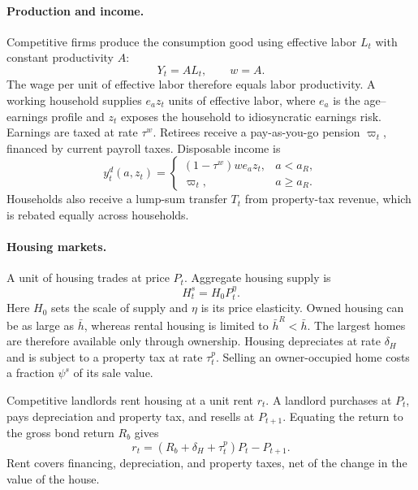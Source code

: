 \paragraph{Production and income.}
Competitive firms produce the consumption good using effective labor $L_t$
with constant productivity $A$:
\begin{equation}
 Y_t=A L_t,\qquad w=A.
 \label{eq:env-production}
\end{equation}
The wage per unit of effective labor therefore equals labor productivity.
A working household supplies $e_a z_t$ units of effective labor, where $e_a$
is the age--earnings profile and $z_t$ exposes the household to idiosyncratic
earnings risk. Earnings are taxed at rate $\tau^w$. Retirees receive a
pay-as-you-go pension $\varpi_t$, financed by current payroll taxes.
Disposable income is
\begin{equation}
 y_t^d(a,z_t)=
 \begin{cases}
 (1-\tau^w)w e_a z_t, & a<a_R,\\
 \varpi_t, & a\geq a_R.
 \end{cases}
 \label{eq:env-income}
\end{equation}
Households also receive a lump-sum transfer $T_t$ from property-tax revenue,
which is rebated equally across households.

\paragraph{Housing markets.}
A unit of housing trades at price $P_t$. Aggregate housing supply is
\begin{equation}
 H_t^s=H_0 P_t^{\eta}.
 \label{eq:env-housing-supply}
\end{equation}
Here $H_0$ sets the scale of supply and $\eta$ is its price elasticity.
Owned housing can be as large as $\bar h$, whereas rental housing is limited
to $\bar h^R<\bar h$. The largest homes are therefore available only through
ownership. Housing depreciates at rate $\delta_H$ and is subject to a
property tax at rate $\tau_t^p$. Selling an owner-occupied home costs a
fraction $\psi^s$ of its sale value.

Competitive landlords rent housing at a unit rent $r_t$. A landlord purchases
at $P_t$, pays depreciation and property tax, and resells at $P_{t+1}$.
Equating the return to the gross bond return $R_b$ gives
\begin{equation}
 r_t=(R_b+\delta_H+\tau_t^p)P_t-P_{t+1}.
 \label{eq:env-rent}
\end{equation}
Rent covers financing, depreciation, and property taxes, net of the change
in the value of the house.


